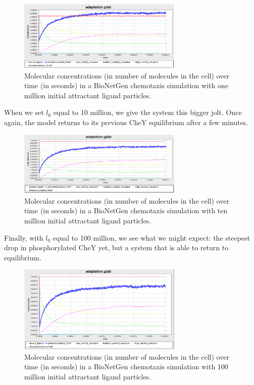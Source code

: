 \begin{figure}[h]
\centering
\mySfFamily
\includegraphics[width = 0.7\textwidth]{../images/chemotaxis_tutorial_oneadd1e6.png}
\caption{Molecular concentrations (in number of molecules in the cell) over time (in seconds) in a BioNetGen chemotaxis simulation with one million initial attractant ligand particles.}
\label{fig:chemotaxis_tutorial_oneadd16}
\end{figure}

When we set $l_0$ equal to 10 million, we give the system this bigger jolt. Once again, the model returns to its previous CheY equilibrium after a few minutes.

\begin{figure}[h]
\centering
\mySfFamily
\includegraphics[width = 0.7\textwidth]{../images/chemotaxis_tutorial_oneadd1e7.png}
\caption{Molecular concentrations (in number of molecules in the cell) over time (in seconds) in a BioNetGen chemotaxis simulation with ten million initial attractant ligand particles.}
\label{fig:chemotaxis_tutorial_oneadd1e7}
\end{figure}

Finally, with $l_0$ equal to 100 million, we see what we might expect: the steepest drop in phosphorylated CheY yet, but a system that is able to return to equilibrium.

\begin{figure}[h]
\centering
\mySfFamily
\includegraphics[width = 0.7\textwidth]{../images/chemotaxis_tutorial_oneadd1e8.png}
\caption{Molecular concentrations (in number of molecules in the cell) over time (in seconds) in a BioNetGen chemotaxis simulation with 100 million initial attractant ligand particles.}
\label{fig:chemotaxis_tutorial_oneadd1e8}
\end{figure}

